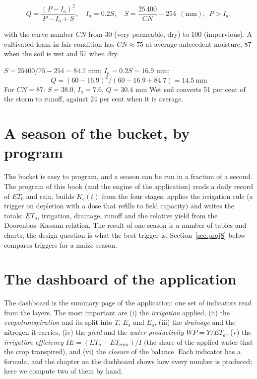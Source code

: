 \begin{equation}Q=\frac{(P-I_a)^2}{P-I_a+S},\quad I_a=0.2S,\quad S=\frac{25\,400}{CN}-254\ \ (\text{mm}),\ \ P>I_a,\label{eq:cn8}\end{equation}


with the curve number $CN$ from 30 (very permeable, dry) to 100 (impervious). A cultivated loam in fair condition has $CN\approx75$ at average antecedent moisture, 87 when the soil is wet and 57 when dry.

\sol {}\ans $S=25400/75-254=84.7$ mm; $I_a=0.2S=16.9$ mm; \[Q=(60-16.9)^2/(60-16.9+84.7)=14.5\ \text{mm}\] \ans For $CN=87$: $S=38.0$, $I_a=7.6$, $Q=30.4$ mm \ans Wet soil converts 51 per cent of the storm to runoff, against 24 per cent when it is average. \finans

\section{A season of the bucket, by program}
The bucket is easy to program, and a season can be run in a fraction of a second. The program of this book (and the engine of the application) reads a daily record of $ET_0$ and rain, builds $K_c(t)$ from the four stages, applies the irrigation rule (a trigger on depletion with a dose that refills to field capacity) and writes the totals: $ET_a$, irrigation, drainage, runoff and the relative yield from the Doorenbos--Kassam relation. The result of one season is a number of tables and charts; the design question is what the best trigger is. Section~\ref{sec:proj8} below compares triggers for a maize season.

\section{The dashboard of the application}
The dashboard is the summary page of the application: one set of indicators read from the layers. The most important are (i) the \emph{irrigation} applied, (ii) the \emph{evapotranspiration} and its split into $T$, $E_s$ and $E_o$, (iii) the \emph{drainage} and the nitrogen it carries, (iv) the \emph{yield} and the \emph{water productivity} $WP=Y/ET_a$, (v) the \emph{irrigation efficiency} $IE=(ET_a-ET_{rain})/I$ (the share of the applied water that the crop transpired), and (vi) the \emph{closure} of the balance. Each indicator has a formula, and the chapter on the dashboard shows how every number is produced; here we compute two of them by hand.


